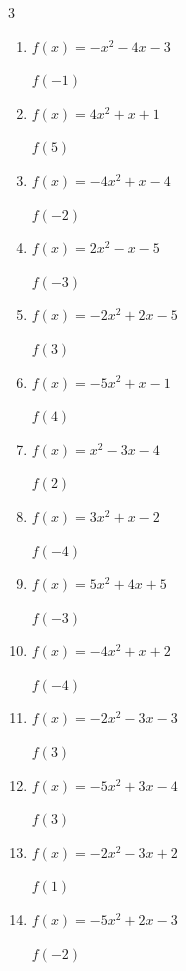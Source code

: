 \begin{multicols}{3}
\begin{enumerate}
  \item $f(x)=-x^{2}-4x-3$

$f(-1)$
        \phantom{$= 0$}

  \item $f(x)=4x^{2}+x+1$

$f(5)$
        \phantom{$= 106$}

\columnbreak %

\resetques

  \item $f(x)=-4x^{2}+x-4$

$f(-2)$
        \phantom{$= -22$}

  \item $f(x)=2x^{2}-x-5$

$f(-3)$
        \phantom{$= 16$}

  \item $f(x)=-2x^{2}+2x-5$

$f(3)$
        \phantom{$= -17$}

  \item $f(x)=-5x^{2}+x-1$

$f(4)$
        \phantom{$= -77$}

  \item $f(x)=x^{2}-3x-4$

$f(2)$
        \phantom{$= -6$}

  \item $f(x)=3x^{2}+x-2$

$f(-4)$
        \phantom{$= 42$}

  \item $f(x)=5x^{2}+4x+5$

$f(-3)$
        \phantom{$= 38$}

  \item $f(x)=-4x^{2}+x+2$

$f(-4)$
        \phantom{$= -66$}

  \item $f(x)=-2x^{2}-3x-3$

$f(3)$
        \phantom{$= -30$}

  \item $f(x)=-5x^{2}+3x-4$

$f(3)$
        \phantom{$= -40$}

  \item $f(x)=-2x^{2}-3x+2$

$f(1)$
        \phantom{$= -3$}

  \item $f(x)=-5x^{2}+2x-3$

$f(-2)$
        \phantom{$= -27$}


\end{enumerate}
\end{multicols}
